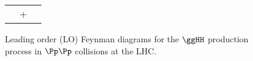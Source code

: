 \begin{figure}
\setlength{\unitlength}{1mm}
\begin{center}
\begin{tabular}{ccc}
\raisebox{-.45\height}{\resizebox{0.3\textwidth}{!}{}} &
\qquad + &
\raisebox{-.45\height}{\resizebox{0.3\textwidth}{!}{}}
\end{tabular}
\end{center}
\caption{
  Leading order (LO) Feynman diagrams for the $\ggHH$ production process in $\Pp\Pp$ collisions at the LHC.
}
\label{fig:ggHH_FeynmanDiagram}
\end{figure}

